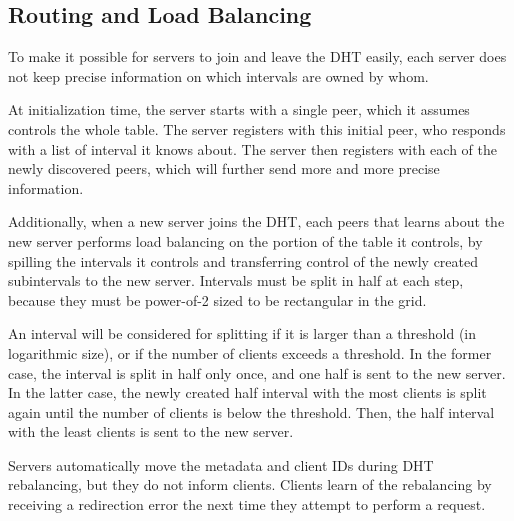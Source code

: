 \subsection{Routing and Load Balancing}

To make it possible for servers to join and leave the DHT easily, each server does not keep precise information on which intervals are owned by whom.

At initialization time, the server starts with a single peer, which it assumes controls the whole table.
The server registers with this initial peer, who responds with a list of interval it knows about.
The server then registers with each of the newly discovered peers, which will further send more and more precise information.

Additionally, when a new server joins the DHT, each peers that learns about the new server performs load balancing on the portion of the table it controls, by spilling the intervals it controls and transferring control of the newly created subintervals to the new server.
Intervals must be split in half at each step, because they must be power-of-2 sized to be rectangular in the grid.

An interval will be considered for splitting if it is larger than a threshold (in logarithmic size), or if the number of clients exceeds a threshold.
In the former case, the interval is split in half only once, and one half is sent to the new server.
In the latter case, the newly created half interval with the most clients is split again until the number of clients is below the threshold.
Then, the half interval with the least clients is sent to the new server.

Servers automatically move the metadata and client IDs during DHT rebalancing, but they do not inform clients.
Clients learn of the rebalancing by receiving a redirection error the next time they attempt to perform a request.
